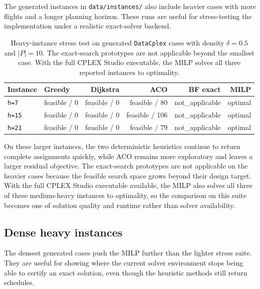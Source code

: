 The generated instances in \texttt{data/instances/} also include heavier cases
with more flights and a longer planning horizon.  These runs are useful for
stress-testing the implementation under a realistic exact-solver backend.

\begin{table}[t]
\centering\small
\caption{Heavy-instance stress test on generated \texttt{DataCplex} cases
  with density $\delta=0.5$ and $|P|=10$.  The exact-search prototypes are
  not applicable beyond the smallest case.  With the full CPLEX Studio
  executable, the MILP solves all three reported instances to optimality.}
\label{tab:heavy_suite}
\begin{tabular}{l l r r r r}
\toprule
Instance & Greedy & Dijkstra & ACO & BF exact & MILP \\
\midrule
\texttt{h=7}  & feasible / 0 & feasible / 0 & feasible / 80  & not\_applicable & optimal \\
\texttt{h=15} & feasible / 0 & feasible / 0 & feasible / 106 & not\_applicable & optimal \\
\texttt{h=21} & feasible / 0 & feasible / 0 & feasible / 79  & not\_applicable & optimal \\
\bottomrule
\end{tabular}
\end{table}

On these larger instances, the two deterministic heuristics continue to return
complete assignments quickly, while ACO remains more exploratory and leaves a
larger residual objective.  The exact-search prototypes are not applicable on
the heavier cases because the feasible search space grows beyond their design
target.  With the full CPLEX Studio executable available, the MILP also solves
all three of these medium-heavy instances to optimality, so the comparison on
this suite becomes one of solution quality and runtime rather than solver
availability.

\subsection{Dense heavy instances}

The densest generated cases push the MILP further than the lighter stress
suite.  They are useful for showing where the current solver environment stops
being able to certify an exact solution, even though the heuristic methods
still return schedules.

